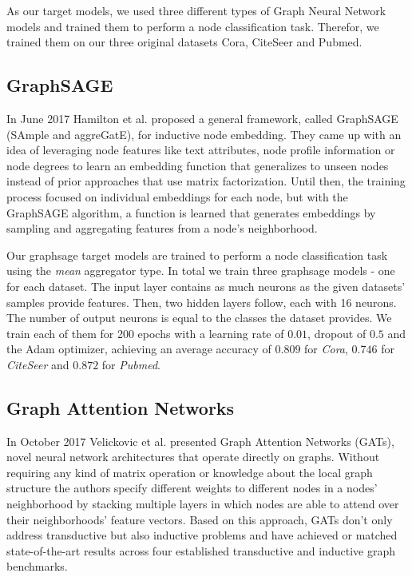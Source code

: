     As our target models, we used three different types of Graph Neural Network models and trained them to perform a node classification task. 
    Therefor, we trained them on our three original datasets Cora, CiteSeer and Pubmed.

    \subsection*{GraphSAGE}
      In June 2017 Hamilton et al.\cite{hamilton2018inductive} proposed a general framework, called GraphSAGE (SAmple and aggreGatE), for inductive node embedding. 
      They came up with an idea of leveraging node features like text attributes, node profile information or node degrees to learn an embedding function that generalizes to unseen nodes instead of prior approaches that use matrix factorization.
      Until then, the training process focused on individual embeddings for each node, but with the GraphSAGE algorithm, a function is learned that generates embeddings by sampling and aggregating features from a node's neighborhood.

      Our graphsage target models are trained to perform a node classification task using the \emph{mean} aggregator type.
      In total we train three graphsage models - one for each dataset.
      The input layer contains as much neurons as the given datasets' samples provide features.
      Then, two hidden layers follow, each with 16 neurons.
      The number of output neurons is equal to the classes the dataset provides.
      We train each of them for 200 epochs with a learning rate of $0.01$, dropout of $0.5$ and the Adam optimizer, achieving an average accuracy of $0.809$ for \emph{Cora}, $0.746$ for \emph{CiteSeer} and $0.872$ for \emph{Pubmed}.

    \subsection*{Graph Attention Networks}
      In October 2017 Velickovic et al.\cite{gat} presented Graph Attention Networks (GATs), novel neural network architectures that operate directly on graphs.
      Without requiring any kind of matrix operation or knowledge about the local graph structure the authors specify different weights to different nodes in a nodes' neighborhood by stacking multiple layers in which nodes are able to attend over their neighborhoods' feature vectors.
      Based on this approach, GATs don't only address transductive but also inductive problems and have achieved or matched state-of-the-art results across four established transductive and inductive graph benchmarks.

